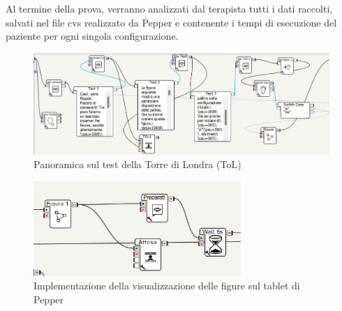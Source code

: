 \begin{sloppypar}
{Al termine della prova, verranno analizzati dal terapista tutti i dati raccolti, salvati nel file cvs realizzato da Pepper e contenente i tempi di esecuzione del paziente per ogni singola configurazione.
\vspace{0.6cm}
\begin{figure}[H]
\centering
\includegraphics[width=1\textwidth]{immagini/tol1.png}
\caption{Panoramica sul test della Torre di Londra (ToL)}
\end{figure}
\vspace{1cm}
\begin{figure}[H]
\centering
\includegraphics[width=0.7\textwidth]{immagini/tol2.png}
\caption{Implementazione della visualizzazione delle figure sul tablet di Pepper}
\end{figure}
\newpage
}
 \end{sloppypar}
\afterpage{\blankpage}